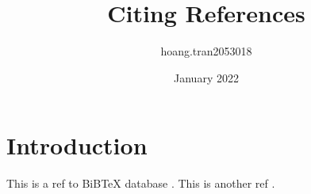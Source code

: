 \documentclass{article}
\title{Citing References}
\author{hoang.tran2053018 }
\date{January 2022}
\begin{document}
\maketitle

\section{Introduction}
This is a ref to BiBTeX database \cite{shelley}. This is another ref \cite{mittelbach2004latex}.






\begin{comment} %
A good fairy tail can be found in \cite[p.37]{andersen}. A good book is the following \cite[p.~45]{shelley}.


\begin{thebibliography}{2}
\bibitem{andersen}
H. C. Andersen. \textit{The Little Mermaid}. 1837

\bibitem{shelley}
M. Shelley. \textit{Frankenstein}. Oxford University Press, 1818.

\end{thebibliography}
\end{comment}
\end{document}
